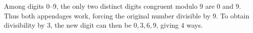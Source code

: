 Among digits 0--9, the only two distinct digits congruent modulo 9 are 0 and 9. Thus both appendages work, forcing the original number divisible by 9. To obtain divisibility by 3, the new digit can then be $0,3,6,9$, giving $\boxed4$ ways.
